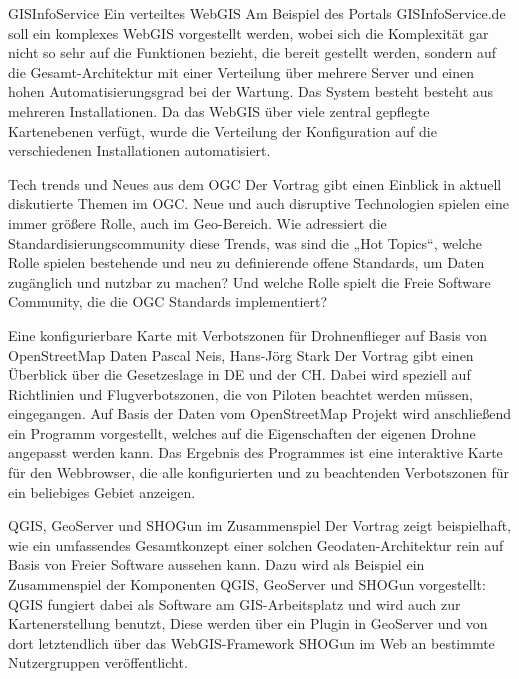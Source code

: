 %
{GISInfoService}%
{Ein verteiltes WebGIS}%
{%
Am Beispiel des Portals GISInfoService.de soll ein komplexes WebGIS vorgestellt werden, wobei sich die Komplexität gar nicht so sehr auf die Funktionen bezieht,  die bereit gestellt werden, sondern auf die Gesamt-Architektur mit einer Verteilung über mehrere Server und einen hohen Automatisierungsgrad bei der Wartung. Das System besteht besteht aus mehreren Installationen. Da das WebGIS über viele zentral gepflegte Kartenebenen verfügt, wurde die Verteilung der Konfiguration auf die verschiedenen Installationen automatisiert.%
}

%
{Tech trends und Neues aus dem OGC}%
{}%
{%
Der Vortrag gibt einen Einblick in aktuell diskutierte Themen im OGC.
Neue und auch disruptive Technologien spielen eine immer größere Rolle, auch im Geo-Bereich. Wie adressiert die Standardisierungscommunity diese Trends, was sind die „Hot Topics“, welche Rolle spielen bestehende und neu zu definierende offene Standards, um Daten zugänglich und nutzbar zu machen? Und welche Rolle spielt die Freie Software Community, die die OGC Standards implementiert?%
}

%
{Eine konfigurierbare Karte mit Verbotszonen für Drohnenflieger auf Basis von OpenStreetMap Daten}%
{Pascal Neis, Hans-Jörg Stark}%
{%
Der Vortrag gibt einen Überblick über die Gesetzeslage in DE und der CH. Dabei wird speziell auf Richtlinien und Flugverbotszonen, die von Piloten beachtet werden müssen, eingegangen. Auf Basis der Daten vom OpenStreetMap Projekt wird anschließend ein Programm vorgestellt, welches auf die Eigenschaften der eigenen Drohne angepasst werden kann. Das Ergebnis des Programmes ist eine interaktive Karte für den Webbrowser, die alle konfigurierten und zu beachtenden Verbotszonen für ein beliebiges Gebiet anzeigen.%
}

%
{QGIS, GeoServer und SHOGun im Zusammenspiel}%
{}%
{%
Der Vortrag zeigt beispielhaft, wie ein umfassendes Gesamtkonzept einer solchen Geodaten-Architektur rein auf Basis von Freier Software aussehen kann. 
Dazu wird als Beispiel ein Zusammenspiel der Komponenten QGIS, GeoServer und SHOGun vorgestellt: QGIS fungiert dabei als Software am GIS-Arbeitsplatz und wird auch zur Kartenerstellung benutzt, Diese werden über ein Plugin in GeoServer und von dort letztendlich über das WebGIS-Framework SHOGun im Web an bestimmte Nutzergruppen veröffentlicht.%
}


